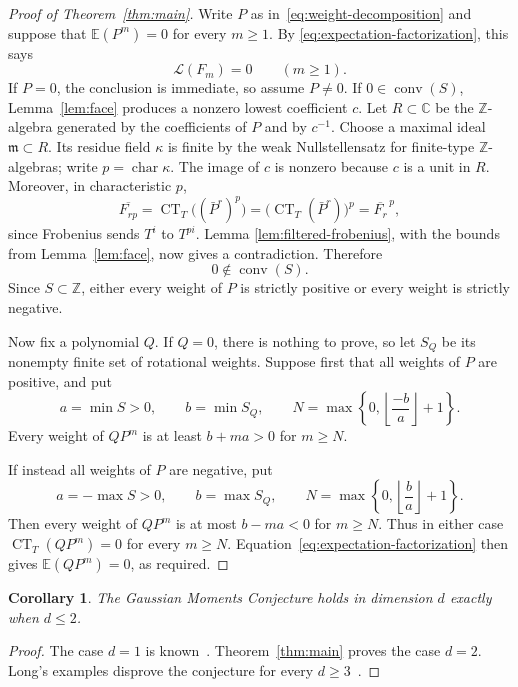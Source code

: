 \documentclass[11pt]{article}
\newtheorem{corollary}[theorem]{Corollary}
\newcommand{\C}{\mathbb C}
\newcommand{\Z}{\mathbb Z}
\newcommand{\E}{\mathbb E}
\newcommand{\CT}{\operatorname{CT}}
\newcommand{\conv}{\operatorname{conv}}
\begin{document}
\begin{proof}[Proof of Theorem~\ref{thm:main}]
Write \(P\) as in~\eqref{eq:weight-decomposition} and suppose that
\(\E(P^m)=0\) for every \(m\geq1\).  By
\eqref{eq:expectation-factorization}, this says
\[
  \mathcal L(F_m)=0\qquad(m\geq1).
\]
If \(P=0\), the conclusion is immediate, so assume \(P\neq0\).
If \(0\in\conv(S)\), Lemma~\ref{lem:face} produces a nonzero lowest
coefficient \(c\).  Let \(R\subset\C\) be the \(\Z\)-algebra generated by
the coefficients of \(P\) and by \(c^{-1}\).  Choose a maximal ideal
\(\mathfrak m\subset R\).  Its residue field \(\kappa\) is finite by the
weak Nullstellensatz for finite-type \(\Z\)-algebras; write
\(p=\operatorname{char}\kappa\).  The image of \(c\) is nonzero because
\(c\) is a unit in \(R\).  Moreover, in characteristic \(p\),
\[
  \overline{F_{rp}}
  =\CT_T\bigl((\bar P^r)^p\bigr)
  =\bigl(\CT_T(\bar P^r)\bigr)^p
  =\overline{F_r}^{\,p},
\]
since Frobenius sends \(T^i\) to \(T^{pi}\).  Lemma
\ref{lem:filtered-frobenius}, with the bounds from Lemma~\ref{lem:face},
now gives a contradiction.  Therefore
\[
  0\notin\conv(S).
\]
Since \(S\subset\Z\), either every weight of \(P\) is strictly positive or
every weight is strictly negative.

Now fix a polynomial \(Q\).  If \(Q=0\), there is nothing to prove, so let
\(S_Q\) be its nonempty finite set of rotational weights.  Suppose first
that all weights of \(P\) are positive, and put
\[
  a=\min S>0,\qquad b=\min S_Q,\qquad
  N=\max\left\{0,\left\lfloor\frac{-b}{a}\right\rfloor+1\right\}.
\]
Every weight of \(QP^m\) is at least \(b+ma>0\) for \(m\geq N\).

If instead all weights of \(P\) are negative, put
\[
  a=-\max S>0,\qquad b=\max S_Q,\qquad
  N=\max\left\{0,\left\lfloor\frac{b}{a}\right\rfloor+1\right\}.
\]
Then every weight of \(QP^m\) is at most \(b-ma<0\) for \(m\geq N\).
Thus in either case \(\CT_T(QP^m)=0\) for every \(m\geq N\).
Equation~\eqref{eq:expectation-factorization} then gives
\(\E(QP^m)=0\), as required.
\end{proof}

\begin{corollary}\label{cor:classification}
The Gaussian Moments Conjecture holds in dimension \(d\) exactly when
\(d\leq2\).
\end{corollary}

\begin{proof}
The case \(d=1\) is known~\cite[Proposition~4.2]{DVZ}.
Theorem~\ref{thm:main} proves the case \(d=2\).
Long's examples disprove the conjecture for every \(d\geq3\)~\cite{Long}.
\end{proof}
\end{document}

